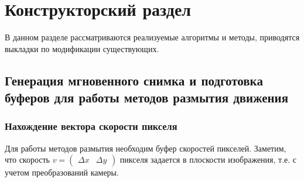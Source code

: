 \chapter{Конструкторский раздел}
\label{cha:design}

В данном разделе рассматриваются реализуемые алгоритмы и методы, приводятся выкладки по модификации существующих.

\section{Генерация мгновенного снимка и подготовка буферов для работы методов размытия движения}

\subsection{Нахождение вектора скорости пикселя}

Для работы методов размытия необходим буфер скоростей пикселей. Заметим, что скорость $v = \begin{pmatrix}
        {\Delta x} & {\Delta y}
    \end{pmatrix}$ пикселя задается в плоскости изображения, т.е. с учетом преобразований камеры.

